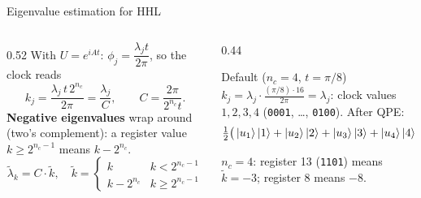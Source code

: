 \documentclass[aspectratio=169,11pt]{beamer}
\newcommand{\key}[1]{{\color{qdark}\textbf{#1}}}
\newcommand{\lt}{\tilde\lambda}
\begin{document}
\begin{frame}{Eigenvalue estimation for HHL}
  \begin{columns}[T]
    \begin{column}{0.52\textwidth}
      With $U = e^{iAt}$: $\phi_j = \dfrac{\lambda_jt}{2\pi}$, so the clock reads
      \[ k_j = \frac{\lambda_j\,t\,2^{n_c}}{2\pi} = \frac{\lambda_j}{C},\qquad C = \frac{2\pi}{2^{n_c}t}. \]
      \key{Negative eigenvalues} wrap around (two's complement): a register value $k \ge 2^{n_c-1}$ means $k - 2^{n_c}$.
      \small\[ \lt_k = C\cdot\tilde k,\quad \tilde k = \begin{cases}k & k < 2^{n_c-1}\\ k - 2^{n_c} & k \ge 2^{n_c-1}\end{cases} \]
    \end{column}
    \begin{column}{0.44\textwidth}
      \begin{exampleblock}{Default ($n_c = 4$, $t = \pi/8$)}
        $k_j = \lambda_j\cdot\frac{(\pi/8)\cdot16}{2\pi} = \lambda_j$: clock values $1, 2, 3, 4$ (\texttt{0001}, \dots, \texttt{0100}). After QPE:
        \[ \tfrac12\big(\ket{u_1}\ket1 + \ket{u_2}\ket2 + \ket{u_3}\ket3 + \ket{u_4}\ket4\big) \]
      \end{exampleblock}
      \small $n_c = 4$: register 13 (\texttt{1101}) means $\tilde k = -3$; register 8 means $-8$.
    \end{column}
  \end{columns}
\end{frame}

\end{document}
